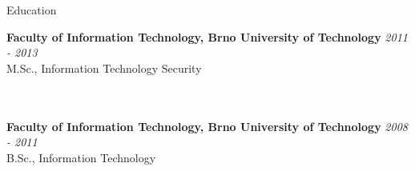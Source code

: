 \documentclass{cv} %
\begin{document}

\begin{rSection}{Education}

{\bf Faculty of Information Technology, Brno University of Technology} \hfill {\em 2011 - 2013} 
\\ M.Sc., Information Technology Security

\\\\{\bf Faculty of Information Technology, Brno University of Technology} \hfill {\em 2008 - 2011} 
\\ B.Sc., Information Technology

\end{rSection}
\end{document}
